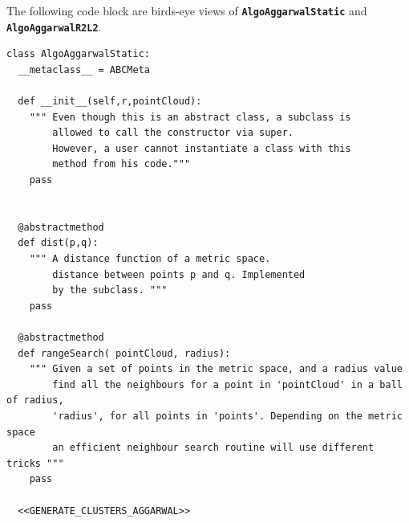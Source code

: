 \documentclass[11pt]{article}
\begin{document}
The following code block are birds-eye views of \textbf{\verb~AlgoAggarwalStatic~} and \textbf{\verb~AlgoAggarwalR2L2~}. 
\begin{verbatim}
class AlgoAggarwalStatic:
  __metaclass__ = ABCMeta

  def __init__(self,r,pointCloud):
    """ Even though this is an abstract class, a subclass is 
        allowed to call the constructor via super. 
        However, a user cannot instantiate a class with this 
        method from his code."""
    pass 


  @abstractmethod
  def dist(p,q):
    """ A distance function of a metric space.
        distance between points p and q. Implemented 
        by the subclass. """
    pass

  @abstractmethod
  def rangeSearch( pointCloud, radius):
    """ Given a set of points in the metric space, and a radius value
        find all the neighbours for a point in 'pointCloud' in a ball of radius, 
        'radius', for all points in 'points'. Depending on the metric space 
        an efficient neighbour search routine will use different tricks """ 
    pass 

  <<GENERATE_CLUSTERS_AGGARWAL>>
\end{verbatim}
\end{document}
